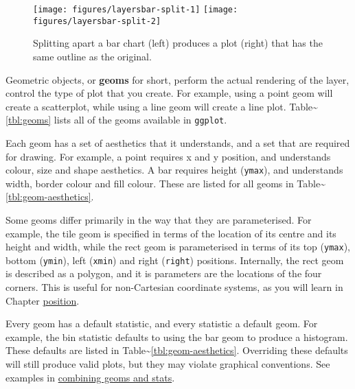 \begin{Shaded}
\begin{Highlighting}[]
 
  
\end{Highlighting}
\end{Shaded}

\begin{figure}
\texttt{[image: figures/layersbar-split-1]} \texttt{[image: figures/layersbar-split-2]} \caption{Splitting apart a bar chart (left) produces a plot (right) that has the same outline as the original.\label{fig:bar-split}}
\end{figure}


Geometric objects, or \textbf{geoms} for short, perform the actual
rendering of the layer, control the type of plot that you create. For
example, using a point geom will create a scatterplot, while using a
line geom will create a line plot. Table\textasciitilde{}\ref{tbl:geoms}
lists all of the geoms available in \texttt{ggplot}.

Each geom has a set of aesthetics that it understands, and a set that
are required for drawing. For example, a point requires x and y
position, and understands colour, size and shape aesthetics. A bar
requires height (\texttt{ymax}), and understands width, border colour
and fill colour. These are listed for all geoms in
Table\textasciitilde{}\ref{tbl:geom-aesthetics}. 

Some geoms differ primarily in the way that they are parameterised. For
example, the tile geom is specified in terms of the location of its
centre and its height and width, while the rect geom is parameterised in
terms of its top (\texttt{ymax}), bottom (\texttt{ymin}), left
(\texttt{xmin}) and right (\texttt{right}) positions. 
Internally, the rect geom is described as a polygon, and it is
parameters are the locations of the four corners. This is useful for
non-Cartesian coordinate systems, as you will learn in Chapter
\hyperref[cha:position]{position}. 

Every geom has a default statistic, and every statistic a default geom.
For example, the bin statistic defaults to using the bar geom to produce
a histogram. These defaults are listed in
Table\textasciitilde{}\ref{tbl:geom-aesthetics}. Overriding these
defaults will still produce valid plots, but they may violate graphical
conventions. See examples in \hyperref[sub:new-plot-types]{combining
geoms and stats}. 

